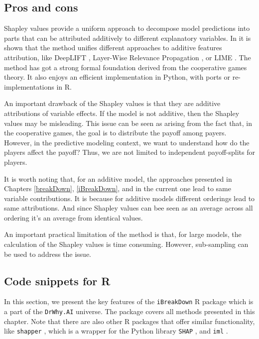 \documentclass[12pt,]{krantz}
\begin{document}
\hypertarget{SHAProsCons}{%
\subsection{Pros and cons}\label{SHAProsCons}}

Shapley values provide a uniform approach to decompose model predictions into parts that can be attributed additively to different explanatory variables. In \citep{SHAP} it is shown that the method unifies different approaches to additive features attribution, like DeepLIFT \citep{DeepLIFT}, Layer-Wise Relevance Propagation \citep{LWRP}, or LIME \citep{lime}. The method has got a strong formal foundation derived from the cooperative games theory. It also enjoys an efficient implementation in Python, with ports or re-implementations in R.

An important drawback of the Shapley values is that they are additive attributions of variable effects. If the model is not additive, then the Shapley values may be misleading. This issue can be seen as arising from the fact that, in the cooperative games, the goal is to distribute the payoff among payers. However, in the predictive modeling context, we want to understand how do the players affect the payoff? Thus, we are not limited to independent payoff-splits for players.

It is worth noting that, for an additive model, the approaches presented in Chapters \ref{breakDown}, \ref{iBreakDown}, and in the current one lead to same variable contributions. It is because for additive models different orderings lead to same attributions. And since Shapley values can bee seen as an average across all ordering it's an average from identical values.

An important practical limitation of the method is that, for large models, the calculation of the Shapley values is time consuming. However, sub-sampling can be used to address the issue.

\hypertarget{SHAPRcode}{%
\subsection{Code snippets for R}\label{SHAPRcode}}

In this section, we present the key features of the \texttt{iBreakDown} R package \citep{iBreakDownRPackage} which is a part of the \texttt{DrWhy.AI} universe. The package covers all methods presented in this chapter.
Note that there are also other R packages that offer similar functionality, like \texttt{shapper} \citep{shapperPackage}, which is a wrapper for the Python library \texttt{SHAP} \citep{shapPackage}, and \texttt{iml} \citep{imlRPackage}.
\end{document}
